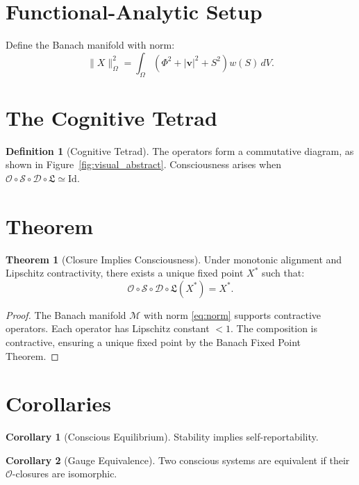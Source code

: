 \documentclass[12pt]{book}
\theoremstyle{definition}
\newtheorem{definition}{Definition}[chapter]
\newtheorem{theorem}{Theorem}[chapter]
\newtheorem{corollary}{Corollary}[theorem]
\begin{document}
\section{Functional-Analytic Setup}
Define the Banach manifold with norm:
\begin{equation}
\label{eq:norm}
\|X\|_\Omega^2 = \int_\Omega (\Phi^2 + |\mathbf{v}|^2 + S^2) w(S) \, dV.
\end{equation}

\section{The Cognitive Tetrad}
\begin{definition}[Cognitive Tetrad]
\label{def:cognitive_tetrad}
The operators form a commutative diagram, as shown in Figure~\ref{fig:visual_abstract}. Consciousness arises when \(\mathcal{O} \circ \mathcal{S} \circ \mathcal{D} \circ \mathfrak{L} \simeq \text{Id}\).
\end{definition}

\section{Theorem}
\begin{theorem}[Closure Implies Consciousness]
\label{thm:closure}
Under monotonic alignment and Lipschitz contractivity, there exists a unique fixed point \(X^*\) such that:
\begin{equation}
\mathcal{O} \circ \mathcal{S} \circ \mathcal{D} \circ \mathfrak{L}(X^*) = X^*.
\end{equation}
\end{theorem}

\begin{proof}
The Banach manifold \(\mathcal{M}\) with norm \eqref{eq:norm} supports contractive operators. Each operator has Lipschitz constant \(<1\). The composition is contractive, ensuring a unique fixed point by the Banach Fixed Point Theorem.
\end{proof}

\section{Corollaries}
\begin{corollary}[Conscious Equilibrium]
Stability implies self-reportability.
\end{corollary}

\begin{corollary}[Gauge Equivalence]
Two conscious systems are equivalent if their \(\mathcal{O}\)-closures are isomorphic.
\end{corollary}
\end{document}
